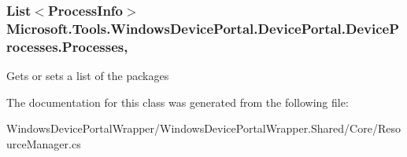 \subsubsection[{\texorpdfstring{Processes}{Processes}}]{\setlength{\rightskip}{0pt plus 5cm}List$<${\bf Process\+Info}$>$ Microsoft.\+Tools.\+Windows\+Device\+Portal.\+Device\+Portal.\+Device\+Processes.\+Processes\hspace{0.3cm}{\ttfamily [get]}, {\ttfamily [set]}}\hypertarget{class_microsoft_1_1_tools_1_1_windows_device_portal_1_1_device_portal_1_1_device_processes_a70435ee2dab80a20369db88c9c218cae}{}\label{class_microsoft_1_1_tools_1_1_windows_device_portal_1_1_device_portal_1_1_device_processes_a70435ee2dab80a20369db88c9c218cae}


Gets or sets a list of the packages 



The documentation for this class was generated from the following file\+:\begin{DoxyCompactItemize}
\item 
Windows\+Device\+Portal\+Wrapper/\+Windows\+Device\+Portal\+Wrapper.\+Shared/\+Core/Resource\+Manager.\+cs\end{DoxyCompactItemize}
